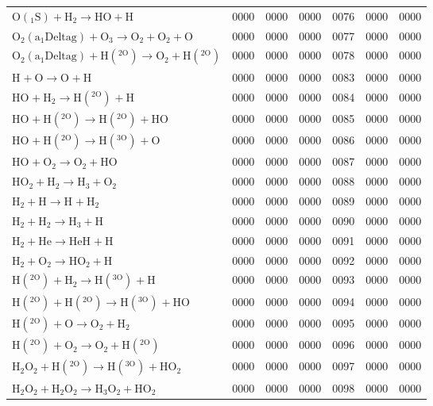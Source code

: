 \begin{longtable}{lrrrrrr}
$\mathrm{O(_1S) + H_2 \rightarrow HO + H}$ & 0000 & 0000 & 0000 & 0076 & 0000 & 0000 \\
$\mathrm{O_2(a_1Deltag) + O_3 \rightarrow O_2 + O_2 + O}$ & 0000 & 0000 & 0000 & 0077 & 0000 & 0000 \\
$\mathrm{O_2(a_1Deltag) + H(^{2O}) \rightarrow O_2 + H(^{2O})}$ & 0000 & 0000 & 0000 & 0078 & 0000 & 0000 \\
$\mathrm{H^{} + O \rightarrow O^{} + H}$ & 0000 & 0000 & 0000 & 0083 & 0000 & 0000 \\
$\mathrm{HO^{} + H_2 \rightarrow H(^{2O})^{} + H}$ & 0000 & 0000 & 0000 & 0084 & 0000 & 0000 \\
$\mathrm{HO^{} + H(^{2O}) \rightarrow H(^{2O})^{} + HO}$ & 0000 & 0000 & 0000 & 0085 & 0000 & 0000 \\
$\mathrm{HO^{} + H(^{2O}) \rightarrow H(^{3O})^{} + O}$ & 0000 & 0000 & 0000 & 0086 & 0000 & 0000 \\
$\mathrm{HO^{} + O_2 \rightarrow O_2^{} + HO}$ & 0000 & 0000 & 0000 & 0087 & 0000 & 0000 \\
$\mathrm{HO_2^{} + H_2 \rightarrow H_3^{} + O_2}$ & 0000 & 0000 & 0000 & 0088 & 0000 & 0000 \\
$\mathrm{H_2^{} + H \rightarrow H^{} + H_2}$ & 0000 & 0000 & 0000 & 0089 & 0000 & 0000 \\
$\mathrm{H_2^{} + H_2 \rightarrow H_3^{} + H}$ & 0000 & 0000 & 0000 & 0090 & 0000 & 0000 \\
$\mathrm{H_2^{} + He \rightarrow HeH^{} + H}$ & 0000 & 0000 & 0000 & 0091 & 0000 & 0000 \\
$\mathrm{H_2^{} + O_2 \rightarrow HO_2^{} + H}$ & 0000 & 0000 & 0000 & 0092 & 0000 & 0000 \\
$\mathrm{H(^{2O})^{} + H_2 \rightarrow H(^{3O})^{} + H}$ & 0000 & 0000 & 0000 & 0093 & 0000 & 0000 \\
$\mathrm{H(^{2O})^{} + H(^{2O}) \rightarrow H(^{3O})^{} + HO}$ & 0000 & 0000 & 0000 & 0094 & 0000 & 0000 \\
$\mathrm{H(^{2O})^{} + O \rightarrow O_2^{} + H_2}$ & 0000 & 0000 & 0000 & 0095 & 0000 & 0000 \\
$\mathrm{H(^{2O})^{} + O_2 \rightarrow O_2^{} + H(^{2O})}$ & 0000 & 0000 & 0000 & 0096 & 0000 & 0000 \\
$\mathrm{H_2O_2^{} + H(^{2O}) \rightarrow H(^{3O})^{} + HO_2}$ & 0000 & 0000 & 0000 & 0097 & 0000 & 0000 \\
$\mathrm{H_2O_2^{} + H_2O_2 \rightarrow H_3O_2^{} + HO_2}$ & 0000 & 0000 & 0000 & 0098 & 0000 & 0000 \\

\end{longtable}

